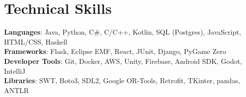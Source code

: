 \documentclass[letterpaper,11pt]{article}
\begin{document}
\section{Technical Skills}
 \begin{itemize}[leftmargin=0.15in, label={}]
    \small{\item{
     \textbf{Languages}{: Java, Python, C\#, C/C++, Kotlin, SQL (Postgres), JavaScript, HTML/CSS, Haskell} \\
     \textbf{Frameworks}{: Flask, Eclipse EMF, React, JUnit, Django, PyGame Zero} \\
     \textbf{Developer Tools}{: Git, Docker, AWS, Unity, Firebase, Android SDK, Godot, IntelliJ} \\
     \textbf{Libraries}{: SWT, Boto3, SDL2, Google OR-Tools, Retrofit, TKinter, pandas, ANTLR} \\
    }}
 \end{itemize}
\end{document}
